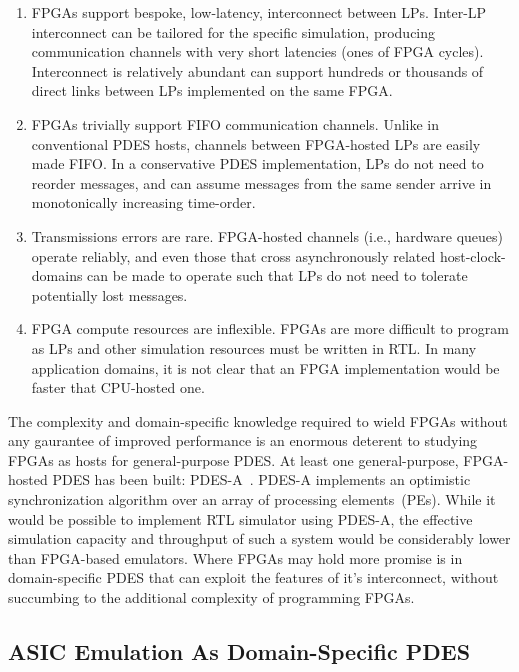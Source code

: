 \begin{enumerate}
\item{FPGAs support bespoke, low-latency, interconnect between LPs.} Inter-LP
interconnect can be tailored for the specific simulation, producing
communication channels with very short latencies (ones of FPGA cycles).
Interconnect is relatively abundant can support hundreds or thousands
of direct links between LPs implemented on the same FPGA.

\item{FPGAs trivially support FIFO communication channels}. Unlike in
conventional PDES hosts, channels between FPGA-hosted LPs are easily made FIFO.
In a conservative PDES implementation, LPs do not need to reorder messages, and
can assume messages from the same sender arrive in monotonically increasing
time-order.

\item{Transmissions errors are rare}. FPGA-hosted channels (i.e., hardware
queues) operate reliably, and even those that cross asynchronously related host-clock-domains
can be made to operate such that LPs do not need to tolerate potentially lost messages.

\item{FPGA compute resources are inflexible}. FPGAs are more difficult to
program as LPs and other simulation resources must be written in RTL. In many application domains,
it is not clear that an FPGA implementation would be faster that CPU-hosted one.
\end{enumerate}

The complexity and domain-specific knowledge required to wield FPGAs without
any gaurantee of improved performance is an enormous deterent to studying FPGAs
as hosts for general-purpose PDES.  At least one general-purpose, FPGA-hosted
PDES has been built: PDES-A~\cite{PDESA}. PDES-A implements an optimistic
synchronization algorithm over an array of processing elements~(PEs).  While it would be
possible to implement RTL simulator using PDES-A, the effective simulation
capacity and throughput of such a system would be considerably lower than
FPGA-based emulators. Where FPGAs may hold more promise is in domain-specific PDES that
can exploit the features of it's interconnect, without succumbing to the additional complexity of programming FPGAs.

\subsection{ASIC Emulation As Domain-Specific PDES}

